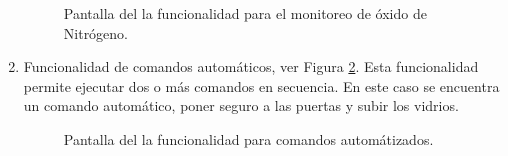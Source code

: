 \begin{enumerate}
\begin{figure}[H]
\centering
{}\hspace{5mm}
\caption{Pantalla del la funcionalidad para el monitoreo de óxido de Nitrógeno.}
\label{monitoreo}
\end{figure}

\item Funcionalidad de comandos automáticos, ver Figura  \ref{comandos}. Esta funcionalidad permite ejecutar dos o más comandos en secuencia. En este caso se encuentra un comando automático, poner seguro a las puertas y subir los vidrios.

\begin{figure}[H]
\centering
{}\hspace{5mm}
\caption{Pantalla del la funcionalidad para comandos automátizados.}
\label{comandos}
\end{figure}


\end{enumerate}

